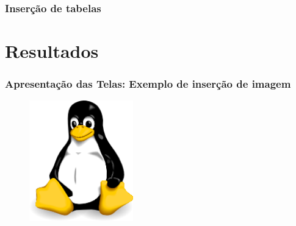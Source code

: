 \documentclass[xcolor=table]{beamer}
\begin{document}
\begin{frame}
    \frametitle{Inserção de tabelas}
    
    \begin{table}[h]
    \centering
    \caption{Título da tabela. Fonte: Autor.}
    \label{comaparacao-cms}
    \end{table}
\end{frame}


\section{Resultados}
\begin{frame}
    \frametitle{Apresentação das Telas: Exemplo de inserção de imagem}
    \begin{figure}[htb]
        \centering
        \includegraphics[width=0.4\textwidth]{figuras/tux.png}
        \label{fig:login-portal}
    \end{figure}
\end{frame}
\end{document}
